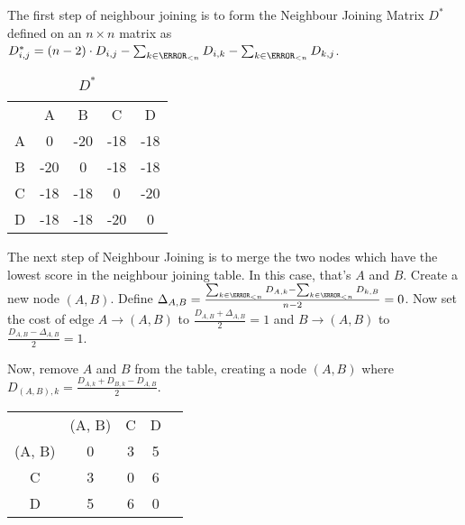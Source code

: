 \documentclass[10pt,\jkfside,a4paper]{article}
\begin{document}
\begin{enumerate}
\begin{itemize}
\begin{table}[H]
        \end{table}

        The first step of neighbour joining is to form the Neighbour Joining Matrix $D^*$ defined on an $n \times n$ matrix as $D^*_{i, j} = (n - 2) \cdot D_{i, j} - \sum_{k \in \N_{<n}} D_{i, k} -
        \sum_{k \in \N_{<n}} D_{k, j}$.

        \begin{table}[H]

            \centering

            \begin{tabular}{ccccc}

                & A & B & C & D \\
                A & 0 & -20 & -18 & -18 \\
                B & -20 & 0 & -18 & -18 \\
                C & -18 & -18 & 0 & -20 \\
                D & -18 & -18 & -20 & 0 \\

            \end{tabular}

            \caption{$D^*$}

        \end{table}

        The next step of Neighbour Joining is to merge the two nodes which have the lowest score in the neighbour joining table. In this case, that's $A$ and $B$. Create a new node $(A, B)$. Define
        $\Delta_{A, B} = \frac{\sum_{k \in \N_{<n}} D_{A, k} - \sum_{k \in \N_{<n}} D_{k, B}}{n - 2} = 0$. Now set the cost of edge $A \to (A, B)$ to $\frac{D_{A, B} + \Delta_{A, B}}{2} = 1$ and
        $B \to (A, B)$ to $\frac{D_{A, B} - \Delta_{A, B}}{2} = 1$.

        Now, remove $A$ and $B$ from the table, creating a node $(A, B)$ where $D_{(A, B), k} = \frac{D_{A, k} + D_{B, k} - D_{A, B}}{2}$.

        \begin{table}[H]

            \centering

            \begin{tabular}{ccccc}

                & (A, B) & C & D \\
                (A, B) & 0 & 3 & 5 \\
                C & 3 & 0 & 6 \\
                D & 5 & 6 & 0 \\


\end{tabular}
\end{table}
\end{itemize}
\end{enumerate}
\end{document}
